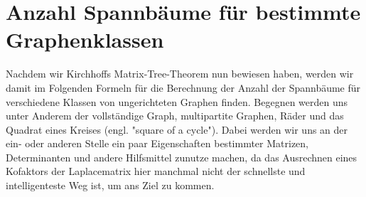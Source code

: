 \section{Anzahl Spannbäume für bestimmte Graphenklassen}
Nachdem wir Kirchhoffs Matrix-Tree-Theorem nun bewiesen haben, werden wir damit im Folgenden Formeln für die Berechnung der Anzahl der Spannbäume für verschiedene Klassen von ungerichteten Graphen finden. Begegnen werden uns unter Anderem der vollständige Graph, multipartite Graphen, Räder und das Quadrat eines Kreises (engl. "square of a cycle"). Dabei werden wir uns an der ein- oder anderen Stelle ein paar Eigenschaften bestimmter Matrizen, Determinanten und andere Hilfsmittel zunutze machen, da das Ausrechnen eines Kofaktors der Laplacematrix hier manchmal nicht der schnellste und intelligenteste Weg ist, um ans Ziel zu kommen. 








